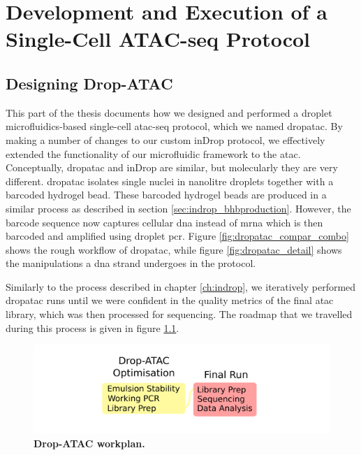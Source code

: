 \chapter{Development and Execution of a Single-Cell ATAC-seq Protocol}
\label{ch:dropatac}

\section{Designing Drop-ATAC}
\label{sec:designing_dropatac}
This part of the thesis documents how we designed and performed a droplet microfluidics-based single-cell \acrshort{atac-seq} protocol, which we named \acrshort{dropatac}. By making a number of changes to our custom inDrop protocol, we effectively extended the functionality of our microfluidic framework to the \acrlong{atac}. Conceptually, \acrshort{dropatac} and inDrop are similar, but molecularly they are very different. \Acrshort{dropatac} isolates single nuclei in nanolitre droplets together with a barcoded hydrogel bead. These barcoded hydrogel beads are produced in a similar process as described in section \ref{sec:indrop_bhbproduction}. However, the barcode sequence now captures cellular \acrshort{dna} instead of \acrshort{mrna} which is then barcoded and amplified using droplet \acrshort{pcr}. Figure \ref{fig:dropatac_compar_combo} shows the rough workflow of \acrshort{dropatac}, while figure \ref{fig:dropatac_detail} shows the manipulations a \acrshort{dna} strand undergoes in the protocol.\pms

Similarly to the process described in chapter \ref{ch:indrop}, we iteratively performed \acrshort{dropatac} runs until we were confident in the quality metrics of the final \acrshort{atac} library, which was then processed for sequencing. The roadmap that we travelled during this process is given in figure \ref{fig:dropatac_workplan}.

\begin{figure}[ht]
\centerfloat
\includegraphics[width=\textwidth]{./ims/dropatac_workplan.png}
\caption[Drop-ATAC workplan]{\textbf{Drop-ATAC workplan.}}
\label{fig:dropatac_workplan}
\end{figure}

